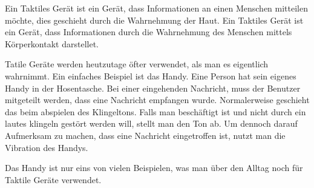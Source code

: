 
Ein Taktiles Ger{\"a}t ist ein Ger{\"a}t, dass Informationen an einen Menschen mitteilen m{\"o}chte, dies geschieht durch die Wahrnehmung der Haut. 
Ein Taktiles Ger{\"a}t ist ein Ger{\"a}t, dass Informationen durch die Wahrnehmung des Menschen mittels K{\"o}rperkontakt darstellet.  \cite{gemperle2001design}

Tatile Ger{\"a}te werden heutzutage {\"o}fter verwendet, als man es eigentlich wahrnimmt. 
Ein einfaches Beispiel ist das Handy. 
Eine Person hat sein eigenes Handy in der Hosentasche. Bei einer eingehenden Nachricht, muss der Benutzer mitgeteilt werden, dass eine Nachricht empfangen wurde.
Normalerweise geschieht das beim abspielen des Klingeltons. Falls man besch{\"a}ftigt ist und nicht durch ein lautes klingeln gest{\"o}rt werden will,  stellt man den Ton ab. 
Um dennoch darauf Aufmerksam zu machen, dass eine Nachricht eingetroffen ist, nutzt man die Vibration des Handys.

Das Handy ist nur eins von vielen Beispielen, was man {\"u}ber den Alltag noch f{\"u}r Taktile Ger{\"a}te verwendet.

